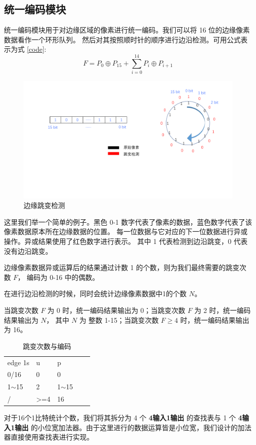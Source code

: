 \documentclass[12pt, a4paper, oneside]{ctexbook}
\begin{document}
	\subsection{统一编码模块}
	统一编码模块用于对边缘区域的像素进行统一编码。我们可以将 16 位的边缘像素数据看作一个环形队列。
	然后对其按照顺时针的顺序进行边沿检测。可用公式表示为式 \ref{code}:
	\begin{equation}
	F=P_{0}\oplus P_{15} + \sum_{i=0}^{14}P_i \oplus P_{i+1}
	\label{code}
	\end{equation}
	\par
		\begin{figure}[h]	
		\centering
		\includegraphics[scale=0.5]{pic/uniform.pdf}
		\caption{边缘跳变检测}
		\end{figure}
	这里我们举一个简单的例子。黑色 0-1 数字代表了像素的数据，蓝色数字代表了该像素数据原本所在边缘数据的位置。
	每一位数据与它对应的下一位数据进行异或操作。异或结果使用了红色数字进行表示。
	其中 1 代表检测到边沿跳变，0 代表没有边沿跳变。
	\par 	边缘像素数据异或运算后的结果通过计数 1 的个数，则为我们最终需要的跳变次数 $F$，
	编码为 0-16 中的偶数。\par 在进行边沿检测的时候，同时会统计边缘像素数据中1的个数 $N$。
	\par 当跳变次数 $F$ 为 0 时，统一编码结果输出为 0；当跳变次数 $F$ 为 2 时，统一编码结果输出为 $N$，
	其中 $N$ 为 整数 1-15；当跳变次数 $F \geq 4$ 时，统一编码结果输出为
	16。
		\begin{table}[h]
		\centering
		\begin{tabular}{|l|l|l|ll}
			\cline{1-3}
			edge 1s   & u                & p           \\ \cline{1-3}
			0/16      & 0                & 0           \\ \cline{1-3}
			1$\sim$15 & 2                & 1$\sim$15   \\ \cline{1-3}
			/         & \textgreater{}=4 & 16          \\ \cline{1-3}
		\end{tabular}
		\caption{跳变次数与编码}
		\end{table}
	\par 对于16个1比特统计个数，我们将其拆分为 4 个 \textbf{4输入1输出} 的查找表与 1 个 \textbf{4输入1输出} 的小位宽加法器。由于这里进行的数据运算皆是小位宽，我们设计的加法器直接使用查找表进行实现。
\end{document}
